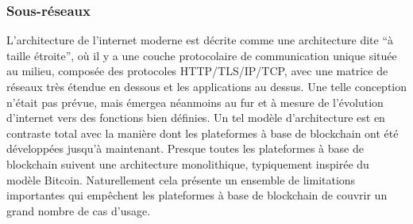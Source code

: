 \documentclass[runningheads]{llncs}
\begin{document}
\subsubsection{Sous-réseaux}
L'architecture de l'internet moderne est décrite comme une architecture dite ``à taille étroite'', où il y a une couche
protocolaire de communication unique située au milieu, composée des protocoles HTTP/TLS/IP/TCP, avec une matrice de
réseaux très étendue en dessous et les applications au dessus. Une telle conception n'était pas prévue, mais émergea
néanmoins au fur et à mesure de l'évolution d'internet vers des fonctions bien définies. Un tel modèle d'architecture
est en contraste total avec la manière dont les plateformes à base de blockchain ont été développées jusqu'à
maintenant. Presque toutes les plateformes à base de blockchain suivent une architecture monolithique, typiquement
inspirée du modèle Bitcoin. Naturellement cela présente un ensemble de limitations importantes qui empêchent les
plateformes à base de blockchain de couvrir un grand nombre de cas d'usage.
\end{document}
